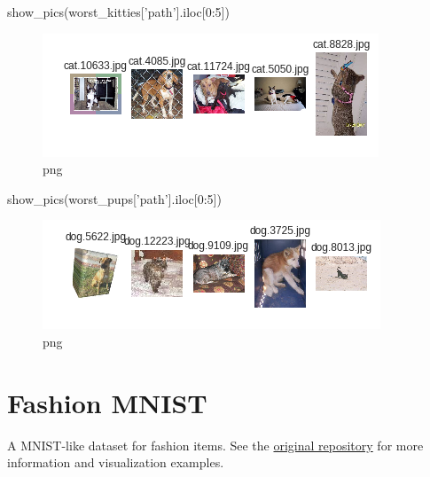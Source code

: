\documentclass[]{book}
\newenvironment{Shaded}{\begin{snugshade}}{\end{snugshade}}
\newcommand{\DecValTok}[1]{\textcolor[rgb]{0.00,0.00,0.81}{#1}}
\newcommand{\StringTok}[1]{\textcolor[rgb]{0.31,0.60,0.02}{#1}}
\newcommand{\NormalTok}[1]{#1}
\theoremstyle{definition}
\theoremstyle{definition}
\theoremstyle{definition}
\theoremstyle{remark}
\begin{document}
\begin{Shaded}
\begin{Highlighting}[]
\NormalTok{show_pics(worst_kitties[}\StringTok{'path'}\NormalTok{].iloc[}\DecValTok{0}\NormalTok{:}\DecValTok{5}\NormalTok{])}
\end{Highlighting}
\end{Shaded}

\begin{figure}
\centering
\includegraphics{CNTK-Transfer-Cats-Dogs_files/CNTK-Transfer-Cats-Dogs_64_0.png}
\caption{png}
\end{figure}

\begin{Shaded}
\begin{Highlighting}[]
\NormalTok{show_pics(worst_pups[}\StringTok{'path'}\NormalTok{].iloc[}\DecValTok{0}\NormalTok{:}\DecValTok{5}\NormalTok{])}
\end{Highlighting}
\end{Shaded}

\begin{figure}
\centering
\includegraphics{CNTK-Transfer-Cats-Dogs_files/CNTK-Transfer-Cats-Dogs_65_0.png}
\caption{png}
\end{figure}

\section{Fashion MNIST}\label{fashion-mnist}

A MNIST-like dataset for fashion items. See the
\href{https://github.com/zalandoresearch/fashion-mnist}{original
repository} for more information and visualization examples.
\end{document}
